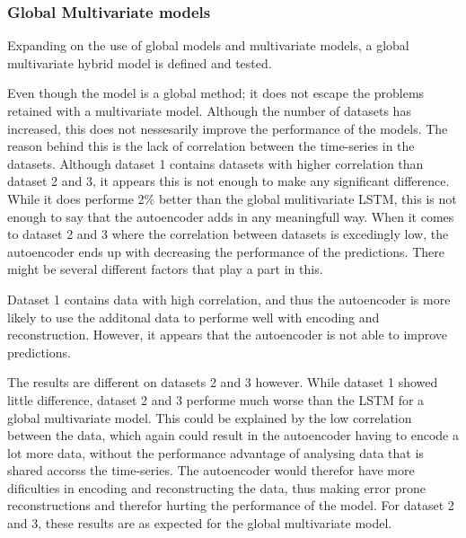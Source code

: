 \subsubsection{Global Multivariate models}

Expanding on the use of global models and multivariate models,
a global multivariate hybrid model is defined and tested.

Even though the model is a global method; it does not escape the problems retained with a multivariate model.
Although the number of datasets has increased, this does not nessesarily improve the performance of the models.
The reason behind this is the lack of correlation between the time-series in the datasets.
Although dataset 1 contains datasets with higher correlation than dataset 2 and 3, it appears this is not enough to make any significant difference.
While it does performe 2\% better than the global mulitivariate LSTM, this is not enough to say that the autoencoder adds
in any meaningfull way.
When it comes to dataset 2 and 3 where the correlation between datasets is excedingly low, the autoencoder ends up with decreasing the performance of the predictions.
There might be several different factors that play a part in this.

Dataset 1 contains data with high correlation, and thus the autoencoder is more likely to use the additonal data to performe well with encoding and reconstruction.
However, it appears that the autoencoder is not able to improve predictions.


The results are different on datasets 2 and 3 however.
While dataset 1 showed little difference, dataset 2 and 3 performe much worse than the LSTM for a global multivariate model.
This could be explained by the low correlation between the data, which again could result in the autoencoder having to encode a lot more data,
without the performance advantage of analysing data that is shared accorss the time-series.
The autoencoder would therefor have more dificulties in encoding and reconstructing the data,
thus making error prone reconstructions and therefor hurting the performance of the model.
For dataset 2 and 3, these results are as expected for the global multivariate model.





